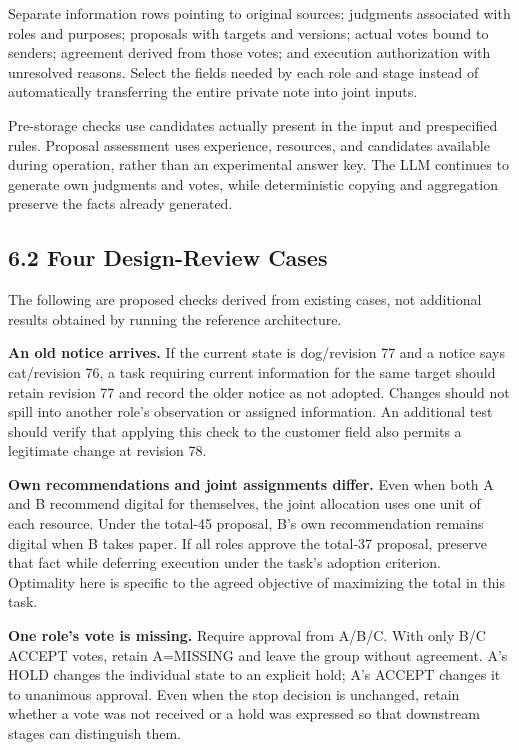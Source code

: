 \documentclass[10pt,a4paper]{article}
\begin{document}
Separate information rows pointing to original sources; judgments associated with roles and purposes; proposals with targets and versions; actual votes bound to senders; agreement derived from those votes; and execution authorization with unresolved reasons. Select the fields needed by each role and stage instead of automatically transferring the entire private note into joint inputs.

Pre-storage checks use candidates actually present in the input and prespecified rules. Proposal assessment uses experience, resources, and candidates available during operation, rather than an experimental answer key. The LLM continues to generate own judgments and votes, while deterministic copying and aggregation preserve the facts already generated.

\subsection{6.2 Four Design-Review Cases}\label{two-role-failure-design-four-design-review-cases}

The following are proposed checks derived from existing cases, not additional results obtained by running the reference architecture.

\textbf{An old notice arrives.} If the current state is dog/revision 77 and a notice says cat/revision 76, a task requiring current information for the same target should retain revision 77 and record the older notice as not adopted. Changes should not spill into another role's observation or assigned information. An additional test should verify that applying this check to the customer field also permits a legitimate change at revision 78.

\textbf{Own recommendations and joint assignments differ.} Even when both A and B recommend digital for themselves, the joint allocation uses one unit of each resource. Under the total-45 proposal, B's own recommendation remains digital when B takes paper. If all roles approve the total-37 proposal, preserve that fact while deferring execution under the task's adoption criterion. Optimality here is specific to the agreed objective of maximizing the total in this task.

\textbf{One role's vote is missing.} Require approval from A/B/C. With only B/C ACCEPT votes, retain A=MISSING and leave the group without agreement. A's HOLD changes the individual state to an explicit hold; A's ACCEPT changes it to unanimous approval. Even when the stop decision is unchanged, retain whether a vote was not received or a hold was expressed so that downstream stages can distinguish them.
\end{document}
